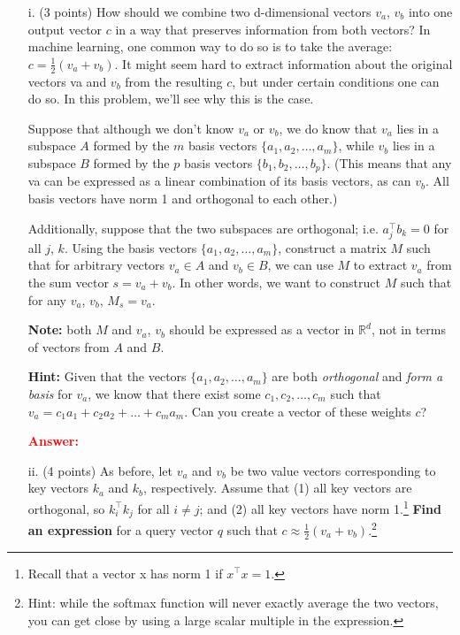 \documentclass[letterpaper,12pt]{article}
\begin{document}
		\begin{itemize}
			\item [i.]
			(3 points) How should we combine two d-dimensional vectors $v_a$, $v_b$ into one output vector $c$ in a way that preserves information from both vectors? In machine learning, one common way to do so is to take the average:  $c = \frac{1}{2}(v_a + v_b)$. It might seem hard to extract information about the original vectors va and $v_b$ from the resulting $c$, but under certain conditions one can do so.
			In this problem, we’ll see why this is the case.
			
			\vspace{1em}
			
			Suppose that although we don’t know $v_a$ or $v_b$, we do know that $v_a$ lies in a subspace $A$ formed by the $m$ basis vectors $\{a_1, a_2, \ldots , a_m\}$, while $v_b$ lies in a subspace $B$ formed by the $p$ basis vectors $\{b_1, b_2, \ldots , b_p\}$. (This means that any va can be expressed as a linear combination of its basis vectors, as can $v_b$. All basis vectors have norm 1 and orthogonal to each other.)
			
			Additionally, suppose that the two subspaces are orthogonal; i.e. $a^\top_j b_k = 0$ for all $j$, $k$.
			Using the basis vectors $\{a_1, a_2, \ldots , a_m\}$, construct a matrix $M$ such that for arbitrary vectors $v_a \in A$ and $v_b \in B$, we can use $M$ to extract $v_a$ from the sum vector $s = v_a + v_b$. In other words, we want to construct $M$ such that for any $v_a$, $v_b$, $M_s = v_a$.
			
			\textbf{Note:} both $M$ and $v_a$, $v_b$ should be expressed as a vector in $\mathbb{R}^d$, not in terms of vectors from $A$ and $B$.
			
			\textbf{Hint:} Given that the vectors $\{a_1, a_2, \ldots , a_m\}$ are both \textit{orthogonal} and \textit{form a basis} for $v_a$, we know that there exist some $c_1, c_2, \ldots , c_m$ such that $v_a = c_1a_1 + c_2a_2 + \ldots + c_ma_m$. Can you create a vector of these weights $c$?
			
			\textcolor{red}{\textbf{Answer:} }
			
			
			\item[ii.]
			(4 points) As before, let $v_a$ and $v_b$ be two value vectors corresponding to key vectors $k_a$ and $k_b$, respectively. Assume that (1) all key vectors are orthogonal, so $k_i^\top k_j$ for all $i \neq j$; and (2) all key vectors have norm 1.\footnote{Recall that a vector x has norm 1 if $x^{\top}x = 1$.} \textbf{Find an expression} for a query vector $q$ such that $c \approx \frac{1}{2}(v_a +v_b)$.\footnote{Hint: while the softmax function will never exactly average the two vectors, you can get close by using a large scalar multiple in the expression.}
		\end{itemize}	
		
\end{document}
